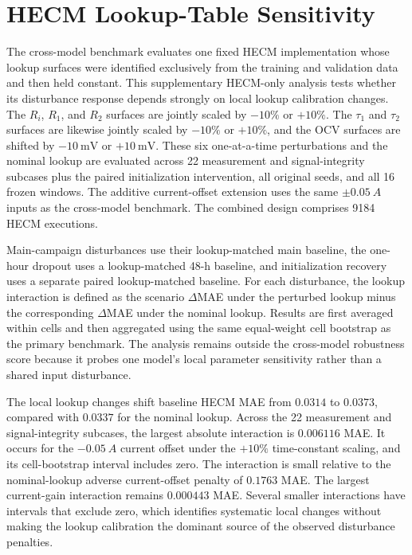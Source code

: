 \documentclass[review,nopreprintline]{elsarticle}
\begin{document}


\clearpage
\section{HECM Lookup-Table Sensitivity}
\label{sec:appendix_hecm_lookup_sensitivity}
The cross-model benchmark evaluates one fixed HECM implementation whose lookup surfaces were identified exclusively from the training and validation data and then held constant. This supplementary HECM-only analysis tests whether its disturbance response depends strongly on local lookup calibration changes. The $R_i$, $R_1$, and $R_2$ surfaces are jointly scaled by $-10\%$ or $+10\%$. The $\tau_1$ and $\tau_2$ surfaces are likewise jointly scaled by $-10\%$ or $+10\%$, and the OCV surfaces are shifted by $-\SI{10}{\milli\volt}$ or $+\SI{10}{\milli\volt}$. These six one-at-a-time perturbations and the nominal lookup are evaluated across 22 measurement and signal-integrity subcases plus the paired initialization intervention, all original seeds, and all 16 frozen windows. The additive current-offset extension uses the same $\pm\SI{0.05}{A}$ inputs as the cross-model benchmark. The combined design comprises 9184 HECM executions.

Main-campaign disturbances use their lookup-matched main baseline, the one-hour dropout uses a lookup-matched 48-h baseline, and initialization recovery uses a separate paired lookup-matched baseline. For each disturbance, the lookup interaction is defined as the scenario $\Delta$MAE under the perturbed lookup minus the corresponding $\Delta$MAE under the nominal lookup. Results are first averaged within cells and then aggregated using the same equal-weight cell bootstrap as the primary benchmark. The analysis remains outside the cross-model robustness score because it probes one model's local parameter sensitivity rather than a shared input disturbance.

The local lookup changes shift baseline HECM MAE from $0.0314$ to $0.0373$, compared with $0.0337$ for the nominal lookup. Across the 22 measurement and signal-integrity subcases, the largest absolute interaction is $0.006116$ MAE. It occurs for the $-\SI{0.05}{A}$ current offset under the $+10\%$ time-constant scaling, and its cell-bootstrap interval includes zero. The interaction is small relative to the nominal-lookup adverse current-offset penalty of $0.1763$ MAE. The largest current-gain interaction remains $0.000443$ MAE. Several smaller interactions have intervals that exclude zero, which identifies systematic local changes without making the lookup calibration the dominant source of the observed disturbance penalties.
\end{document}

